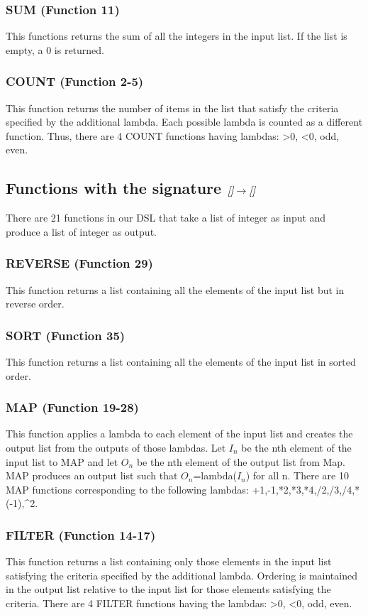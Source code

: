 \subsubsection{SUM (Function 11)}
This functions returns the sum of all the integers in the input list.  If the list is empty, a 0 is returned.
\subsubsection{COUNT (Function 2-5)}
This function returns the number of items in the list that satisfy the criteria specified by the additional lambda.  Each possible lambda is counted as a different function.  Thus, there are 4 COUNT functions having lambdas: >0, <0, odd, even.

\subsection{Functions with the signature $\emph{[]} \rightarrow \emph{[]}$}
There are 21 functions in our DSL that take a list of integer as input and produce a list of integer as output.
\subsubsection{REVERSE (Function 29)}
This function returns a list containing all the elements of the input list but in reverse order.
\subsubsection{SORT (Function 35)}
This function returns a list containing all the elements of the input list in sorted order.
\subsubsection{MAP (Function 19-28)}
This function applies a lambda to each element of the input list and creates the output list from the outputs of those lambdas.  Let $I_n$ be the nth element of the input list to MAP and let $O_n$ be the nth element of the output list from Map.  MAP produces an output list such that $O_n$=lambda($I_n$) for all n.  There are 10 MAP functions corresponding to the following lambdas: +1,-1,*2,*3,*4,/2,/3,/4,*(-1),\^{}2.
\subsubsection{FILTER (Function 14-17)}
This function returns a list containing only those elements in the input list satisfying the criteria specified by the additional lambda.  Ordering is maintained in the output list relative to the input list for those elements satisfying the criteria.  There are 4 FILTER functions having the lambdas: >0, <0, odd, even.
